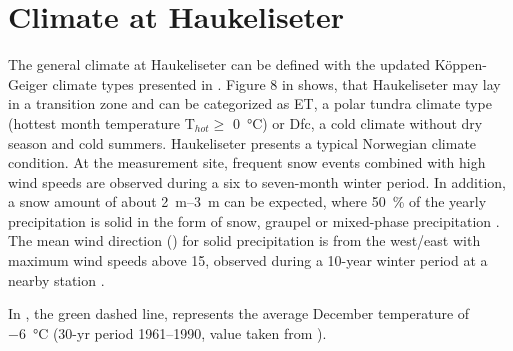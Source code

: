 %
%
%
\section{Climate at Haukeliseter}\label{sec:dim:dec_obs}
The general climate at Haukeliseter can be defined with the updated K\"oppen-Geiger climate types presented in \citet{peel_updated_2007}. Figure 8 in \citet{peel_updated_2007} shows, that Haukeliseter may lay in a transition zone and can be categorized as  ET, a polar tundra climate type (hottest month temperature T$_{hot}\ge$ \SI{0}{\celsius}) or Dfc, a cold climate without dry season and cold summers. 
% 
Haukeliseter presents a typical Norwegian climate condition. At the measurement site, frequent snow events combined with high wind speeds are observed during a six to seven-month winter period. In addition, a snow amount of about \SIrange{2}{3}{\m} can be expected, where \SI{50}{\percent} of the yearly precipitation is solid in the form of snow, graupel or mixed-phase precipitation \citep{wolff_new_2010, wolff_measurements_2013, wolff_derivation_2015}. \\
The mean wind direction () for solid precipitation is from the west/east with maximum wind speeds above \SI{15}{\mPs}, observed during a 10-year winter period at a nearby station \citep{wolff_new_2010, wolff_derivation_2015}. 

In , the green dashed line, represents the average December temperature of \SI{-6}{\celsius} (30-yr period \numrange{1961}{1990}, value taken from \citet{eklima_norwegian_2016}).
